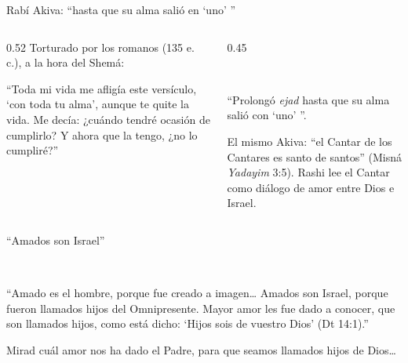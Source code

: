 \begin{frame}{Rabí Akiva: ``hasta que su alma salió en `uno' ''}
\begin{columns}[c,onlytextwidth]
\begin{column}{0.52\textwidth}\small
Torturado por los romanos (135 e.\,c.), a la hora del Shemá:\par\smallskip
\begin{tcolorbox}[colback=papiro,colframe=azul,boxrule=0.8pt,arc=3pt]
\scriptsize ``Toda mi vida me afligía este versículo, `con toda tu alma', aunque te quite la vida. Me decía: ¿cuándo tendré ocasión de cumplirlo? Y ahora que la tengo, ¿no lo cumpliré?''
\end{tcolorbox}
\end{column}
\begin{column}{0.45\textwidth}
\begin{center}\\ \end{center}
\small ``Prolongó \emph{ejad} hasta que su alma salió con `uno' ''.\par\medskip
\scriptsize El mismo Akiva: ``el Cantar de los Cantares es santo de santos'' (Misná \emph{Yadayim} 3:5). Rashi lee el Cantar como diálogo de amor entre Dios e Israel.
\end{column}
\end{columns}
\end{frame}

\begin{frame}{``Amados son Israel''}
\begin{center}\\[1pt]\end{center}
\begin{tcolorbox}[colback=papiro,colframe=azul,boxrule=0.8pt,arc=3pt]
\small ``Amado es el hombre, porque fue creado a imagen\ldots{} Amados son Israel, porque fueron llamados hijos del Omnipresente. Mayor amor les fue dado a conocer, que son llamados hijos, como está dicho: `Hijos sois de \SENOR{} vuestro Dios' (Dt 14:1).''
\end{tcolorbox}
\begin{cita}Mirad cuál amor nos ha dado el Padre, para que seamos llamados hijos de Dios\ldots{}\end{cita}
\end{frame}

